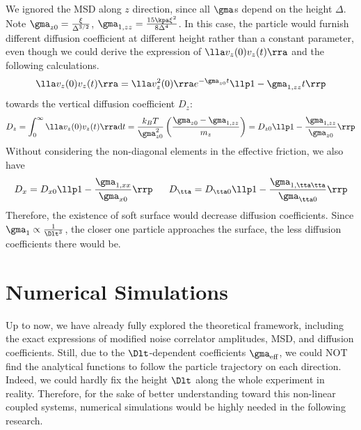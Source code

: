 \documentclass[fleqn,10pt]{InternshipReport-ENS-PSL}
\begin{document}
We ignored the MSD along $z$ direction, since all $\gma$s depend on the height $\Delta$. Note $\gma_{z0} = \frac{\xi}{\Delta^{3/2}}$, $\gma_{1,zz} = \frac{15 \kpa \xi^2}{8 \Delta^4}$. In this case, the particle would furnish different diffusion coefficient at different height rather than a constant parameter, even though we could derive the expression of $\lla v_z(0) v_z(t) \rra$ and the following calculations. 
$$ \lla v_z(0) v_z(t) \rra = \lla v_z^2(0) \rra e^{-\gma_{z0} t} \llp 1 - \gma_{1,zz} t \rrp $$
towards the vertical diffusion coefficient $D_z$:
$$ D_z = \int_0^\infty \lla v_z(0) v_z(t) \rra \mrm{d}t = \frac{k_B T}{\gma_{z0}^2} \left( \frac{\gma_{z0}-\gma_{1,zz}}{m_z} \right) = D_{z0} \llp 1 - \frac{\gma_{1,zz}}{\gma_{z0}} \rrp $$
Without considering the non-diagonal elements in the effective friction, we also have
$$ D_x = D_{x0} \llp 1 - \frac{\gma_{1,xx}}{\gma_{x0}} \rrp \fives D_\tta = D_{\tta0} \llp 1 - \frac{\gma_{1,\tta\tta}}{\gma_{\tta0}} \rrp $$
Therefore, the existence of soft surface would decrease diffusion coefficients. Since $\gma_1 \propto \frac{1}{\Dlt^3}$, the closer one particle approaches the surface, the less diffusion coefficients there would be.





\section*{Numerical Simulations} %

Up to now, we have already fully explored the theoretical framework, including the exact expressions of modified noise correlator amplitudes, MSD, and diffusion coefficients. Still, due to the $\Dlt$-dependent coefficients $\gma_{\mrm{eff}}$, we could NOT find the analytical functions to follow the particle trajectory on each direction. Indeed, we could hardly fix the height $\Dlt$ along the whole experiment in reality. 
Therefore, for the sake of better understanding toward this non-linear coupled systems, numerical simulations would be highly needed in the following research.
\end{document}
